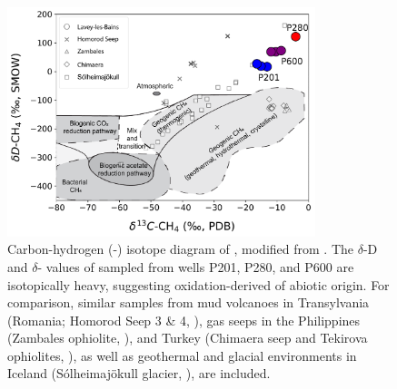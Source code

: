\newpage
\null
\vfill
\begin{figure}[H]
\centering
\includegraphics[width=0.8\textwidth]{chapters/06_appendix/SI_C2/CD-plot.pdf}
\caption{
Carbon-hydrogen (-) isotope diagram of , modified from \citep{burns2018isotopes}.
The $\delta$-D and $\delta$- values of  sampled from wells P201, P280, and P600 are isotopically heavy, suggesting oxidation-derived  of abiotic origin.
For comparison, similar samples from mud volcanoes in Transylvania (Romania; Homorod Seep 3 \& 4, \cite{etiope2011homorod}), gas seeps in the Philippines (Zambales ophiolite, \cite{abrjano1988zambales}), and Turkey (Chimaera seep and Tekirova ophiolites, \cite{etiope2011chimaera}), as well as geothermal and glacial environments in Iceland (Sólheimajökull glacier, \cite{burns2018isotopes}), are included.
}
\label{figSI:CD_plot}
\end{figure}
\vfill 

